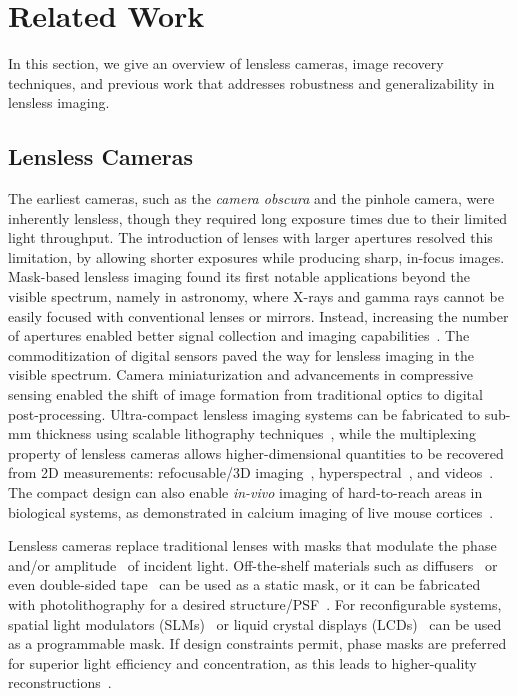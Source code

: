 \section{Related Work}

\noindent In this section, we give an overview of lensless cameras, image recovery techniques, and previous work that addresses robustness and generalizability in lensless imaging.

\subsection{Lensless Cameras}

\noindent The earliest cameras, such as the \textit{camera obscura} and the pinhole camera, were inherently lensless, though they required long exposure times due to their limited light throughput. 
The introduction of lenses with larger apertures resolved this limitation, by allowing shorter exposures while producing sharp, in-focus images.
Mask-based lensless imaging found its first notable applications beyond the visible spectrum, namely in astronomy, where X-rays and gamma rays cannot be easily focused with conventional lenses or mirrors. Instead, increasing the number of apertures enabled better signal collection and imaging capabilities~\cite{dicke1968scatter,caroli1987coded}.
The commoditization of digital sensors paved the way for lensless imaging in the visible spectrum.
Camera miniaturization and advancements in compressive sensing enabled the shift of image formation from traditional optics to digital post-processing. 
Ultra-compact lensless imaging systems can be fabricated to sub-mm thickness using scalable lithography techniques~\cite{Lee:23,flatcam}, 
while the multiplexing property of lensless cameras allows higher-dimensional quantities to be recovered from 2D measurements: refocusable/3D imaging~\cite{Antipa:18,sweepcam2020,zheng2021programmable3dcam}, hyperspectral~\cite{Monakhova:20}, and videos~\cite{antipa2019video}.
The compact design can also enable \textit{in-vivo} imaging of hard-to-reach areas in biological systems, as demonstrated in calcium imaging of live mouse cortices~\cite{adams2022vivo}.

Lensless cameras replace traditional lenses with masks that modulate the phase~\cite{Antipa:18,Monakhova:19,phlatcam,9239993,Lee:23} and/or amplitude~\cite{flatcam,wu2020single} of incident light.
Off-the-shelf materials such as diffusers~\cite{Antipa:18} or even double-sided tape~\cite{Bezzam2023,diffusercam_tut} can be used as a static mask, or it can be fabricated with photolithography for a desired structure/PSF~\cite{phlatcam,Lee:23,flatcam,wu2020single}.
For reconfigurable systems, spatial light modulators (SLMs)~\cite{sweepcam2020,zheng2021programmable3dcam,10.1117/1.OE.54.2.023102} or liquid crystal displays (LCDs)~\cite{4472247,huang2013,zomet2006}  can be used as a programmable mask.
If design constraints permit, phase masks are preferred for superior light efficiency and concentration, as this leads to higher-quality reconstructions~\cite{boominathan2022recent}.


